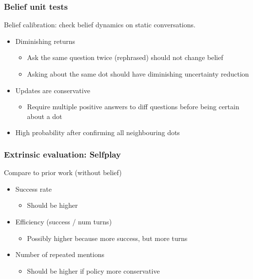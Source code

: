 \documentclass{beamer}
\begin{document}
\begin{frame}
\frametitle{Belief unit tests}
Belief calibration: check belief dynamics on static conversations.
\begin{itemize}
\item Diminishing returns
    \begin{itemize}
    \item Ask the same question twice (rephrased) should not change belief
    \item Asking about the same dot should have diminishing
        uncertainty reduction
    \end{itemize}
\item Updates are conservative
    \begin{itemize}
    \item Require multiple positive answers
        to diff questions before being certain about a dot
    \end{itemize}
\item High probability after confirming all neighbouring dots
\end{itemize}
\end{frame}

\begin{frame}
\frametitle{Extrinsic evaluation: Selfplay}
Compare to prior work (without belief)
\begin{itemize}
\item Success rate
    \begin{itemize}
    \item Should be higher
    \end{itemize}
\item Efficiency (success / num turns)
    \begin{itemize}
    \item Possibly higher because more success, but more turns
    \end{itemize}
\item Number of repeated mentions
    \begin{itemize}
    \item Should be higher if policy more conservative
    \end{itemize}
\end{itemize}
\end{frame}
\end{document}
